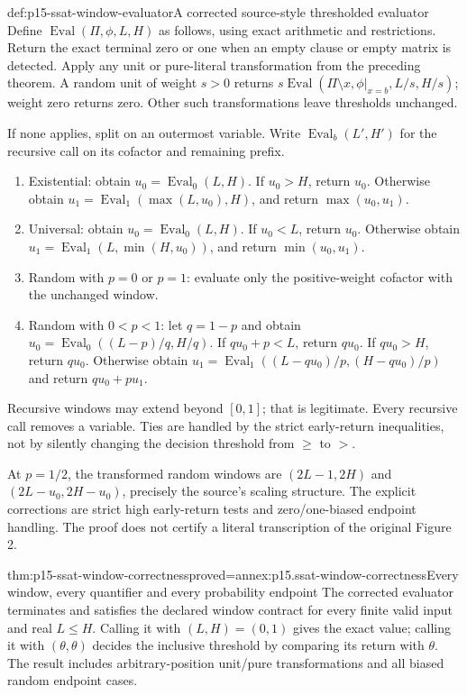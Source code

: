 \begin{hbmethod}{def:p15-ssat-window-evaluator}{A corrected source-style thresholded evaluator}
Define \(\operatorname{Eval}(\Pi,\phi,L,H)\) as follows, using
exact arithmetic and restrictions. Return the exact terminal zero or
one when an empty clause or empty matrix is detected. Apply any unit
or pure-literal transformation from the preceding theorem. A random
unit of weight \(s>0\) returns
\(s\operatorname{Eval}(\Pi\setminus x,\phi|_{x=b},L/s,H/s)\);
weight zero returns zero. Other such transformations leave thresholds
unchanged.

If none applies, split on an outermost variable. Write
\(\operatorname{Eval}_b(L',H')\) for the recursive call on its
cofactor and remaining prefix.
\begin{enumerate}
\item Existential: obtain \(u_0=\operatorname{Eval}_0(L,H)\).
      If \(u_0>H\), return \(u_0\). Otherwise obtain
      \(u_1=\operatorname{Eval}_1(\max(L,u_0),H)\), and return
      \(\max(u_0,u_1)\).
\item Universal: obtain \(u_0=\operatorname{Eval}_0(L,H)\).
      If \(u_0<L\), return \(u_0\). Otherwise obtain
      \(u_1=\operatorname{Eval}_1(L,\min(H,u_0))\), and return
      \(\min(u_0,u_1)\).
\item Random with \(p=0\) or \(p=1\): evaluate only the
      positive-weight cofactor with the unchanged window.
\item Random with \(0<p<1\): let \(q=1-p\) and obtain
      \(u_0=\operatorname{Eval}_0((L-p)/q,H/q)\).
      If \(qu_0+p<L\), return \(qu_0\). If \(qu_0>H\),
      return \(qu_0\). Otherwise obtain
      \(u_1=\operatorname{Eval}_1((L-qu_0)/p,(H-qu_0)/p)\)
      and return \(qu_0+pu_1\).
\end{enumerate}
Recursive windows may extend beyond \([0,1]\); that is legitimate.
Every recursive call removes a variable. Ties are handled by the
strict early-return inequalities, not by silently changing the decision
threshold from \(\geq\) to \(>\).
\end{hbmethod}

At \(p=1/2\), the transformed random windows are
\((2L-1,2H)\) and \((2L-u_0,2H-u_0)\), precisely the
source's scaling structure. The explicit corrections are strict high
early-return tests and zero/one-biased endpoint handling. The proof
does not certify a literal transcription of the original Figure 2.

\begin{hbtheorem}{thm:p15-ssat-window-correctness}{proved=annex:p15.ssat-window-correctness}{Every window, every quantifier and every probability endpoint}
The corrected evaluator terminates and satisfies the declared window
contract for every finite valid input and real \(L\leq H\).
Calling it with \((L,H)=(0,1)\) gives the exact value; calling it
with \((\theta,\theta)\) decides the inclusive threshold by comparing
its return with \(\theta\). The result includes arbitrary-position
unit/pure transformations and all biased random endpoint cases.
\end{hbtheorem}

